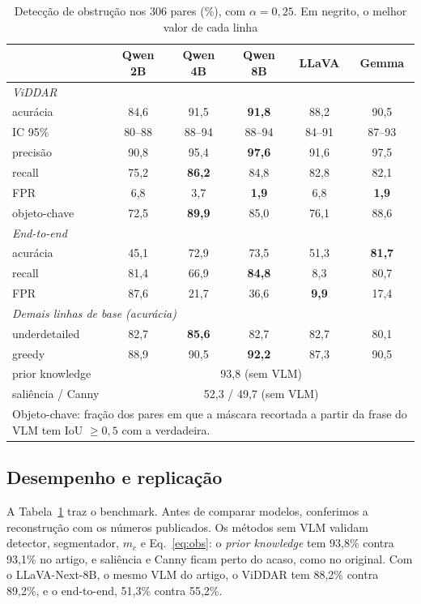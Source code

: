\documentclass[conference]{IEEEtran}
\begin{document}
\begin{table}[!t]
\renewcommand{\arraystretch}{1.05}
\caption{Detecção de obstrução nos 306 pares (\%), com $\alpha=0{,}25$. Em negrito, o melhor valor de
cada linha}
\label{tab:obs}
\centering
\footnotesize
\setlength{\tabcolsep}{3.5pt}
\begin{tabular}{lccccc}
\toprule
 & Qwen 2B & Qwen 4B & Qwen 8B & LLaVA & Gemma \\
\midrule
\multicolumn{6}{l}{\textit{ViDDAR}} \\
\quad acurácia & 84,6 & 91,5 & \textbf{91,8} & 88,2 & 90,5 \\
\quad \scriptsize IC 95\% & \scriptsize 80--88 & \scriptsize 88--94 & \scriptsize 88--94 & \scriptsize 84--91 & \scriptsize 87--93 \\
\quad precisão & 90,8 & 95,4 & \textbf{97,6} & 91,6 & 97,5 \\
\quad recall & 75,2 & \textbf{86,2} & 84,8 & 82,8 & 82,1 \\
\quad FPR & 6,8 & 3,7 & \textbf{1,9} & 6,8 & \textbf{1,9} \\
\quad objeto-chave & 72,5 & \textbf{89,9} & 85,0 & 76,1 & 88,6 \\
\midrule
\multicolumn{6}{l}{\textit{End-to-end}} \\
\quad acurácia & 45,1 & 72,9 & 73,5 & 51,3 & \textbf{81,7} \\
\quad recall & 81,4 & 66,9 & \textbf{84,8} & 8,3 & 80,7 \\
\quad FPR & 87,6 & 21,7 & 36,6 & \textbf{9,9} & 17,4 \\
\midrule
\multicolumn{6}{l}{\textit{Demais linhas de base (acurácia)}} \\
\quad underdetailed & 82,7 & \textbf{85,6} & 82,7 & 82,7 & 80,1 \\
\quad greedy & 88,9 & 90,5 & \textbf{92,2} & 87,3 & 90,5 \\
\quad prior knowledge & \multicolumn{5}{c}{93,8 (sem VLM)} \\
\quad saliência / Canny & \multicolumn{5}{c}{52,3 / 49,7 (sem VLM)} \\
\bottomrule
\multicolumn{6}{L{8.2cm}}{\scriptsize Objeto-chave: fração dos pares em que a máscara recortada a
partir da frase do VLM tem IoU $\geq 0{,}5$ com a verdadeira.}
\end{tabular}
\end{table}

\subsection{Desempenho e replicação}
A Tabela~\ref{tab:obs} traz o benchmark. Antes de comparar modelos, conferimos a reconstrução com os
números publicados. Os métodos sem VLM validam detector, segmentador, $m_c$ e Eq.~\eqref{eq:obs}: o
\emph{prior knowledge} tem 93,8\% contra 93,1\% no artigo, e saliência e Canny ficam perto do acaso,
como no original. Com o LLaVA-Next-8B, o mesmo VLM do artigo, o ViDDAR tem 88,2\% contra 89,2\%, e o
end-to-end, 51,3\% contra 55,2\%.
\end{document}
